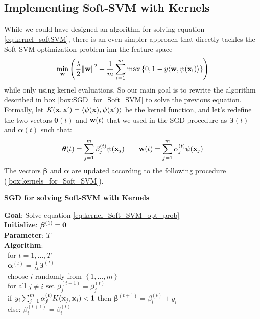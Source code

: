 \documentclass[12pt]{report}
\theoremstyle{plain}
\newcommand\sprod[2]{\langle \vb{#1},\vb{#2}\rangle}
\begin{document}
\begin{flushleft}
\subsection{Implementing Soft-SVM with Kernels}
While we could have designed an algorithm for solving equation \ref{eq:kernel_softSVM}, there is an even simpler approach that directly tackles the Soft-SVM optimization problem inn the feature space
\begin{equation} \min_{\vb{w}}\left(\frac{\lambda}{2}\norm{\vb{w}}^2+\frac{1}{m}\sum_{i=1}^m\max\left\{0,1-y\sprod{w}{\psi(x_i)} \right\}\right)
\label{eq:kernel_Soft_SVM_opt_prob}
\end{equation}
while only using kernel evaluations. So our main goal is to rewrite the algorithm described in box \ref{box:SGD_for_Soft_SVM} to solve the previous equation. Formally, let $K(\vb{x},\vb{x}')=\sprod{\psi(x)}{\psi(x')}$ be the kernel function, and let's redefine the two vectors $\bm{\theta}(t)$ and $\vb{w}(t)$ that we used in the SGD procedure as $\bm{\beta}(t)$ and $\bm{\alpha}(t)$ such that:
\[ \bm{\theta}(t)=\sum_{j=1}^m\beta_j^{(t)}\psi(\vb{x}_j) \qquad \vb{w}(t)=\sum_{j=1}^m\alpha_j^{(t)}\psi(\vb{x}_j) \] 
The vectors $\bm{\beta}$ and $\bm{\alpha}$ are updated according to the following procedure (\ref{box:kernels_for_Soft_SVM}).
\begin{tcolorbox}
	\begin{center}
		\textbf{SGD for solving Soft-SVM with Kernels}
	\end{center}
	\textbf{Goal}: \quad Solve equation \ref{eq:kernel_Soft_SVM_opt_prob}\\ 
	\textbf{Initialize}: \quad $\bm{\beta}^{(1)}=\vb{0}$\\
	\textbf{Parameter}: \qquad $T$\\
	\textbf{Algorithm}:\\
	\-\ \qquad for  $t=1,\dots,T$\\
	\-\ \qquad\quad $\bm{\alpha}^{(t)} = \frac{1}{\lambda t}\bm{\beta}^{(t)}$\\
	\-\ \qquad\quad choose $i$ randomly from $\left\{1,\dots,m\right\}$\\
	\-\ \qquad\quad for all $j\neq i$ set $\beta_j^{(t+1)}=\beta_j^{(t)}$\\
	\-\ \qquad\quad if $y_i\sum_{j=1}^m\alpha_j^{(t)}K(\vb{x}_j,\vb{x}_i)<1$ then $\bm{\beta}^{(t+1)}=\beta_i^{(t)}+y_i$\\
	\-\ \qquad\quad else: $\beta_i^{(t+1)}=\beta_i^{(t)}$\\
	

\end{tcolorbox}
\end{flushleft}
\end{document}
